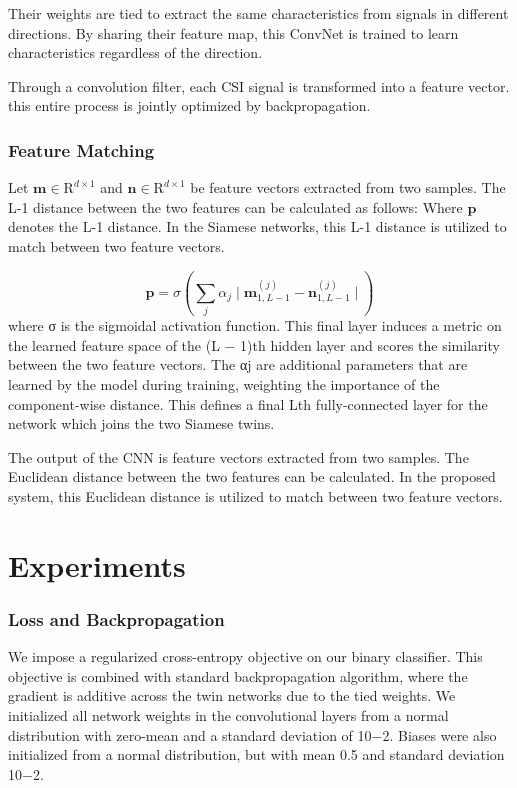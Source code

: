 \documentclass[runningheads]{llncs}
\begin{document}
Their weights are tied to extract the same characteristics from signals in different directions.
By sharing their feature map, this ConvNet is trained to learn characteristics regardless of the direction.

Through a convolution filter, each CSI signal is transformed into a feature vector. this entire process is jointly optimized by backpropagation.


\subsubsection{Feature Matching}

Let $\mathbf{m}\in{\mathrm{R}}^{d\times1}$ and $\mathbf{n}\in{\mathrm{R}}^{d\times1}$ be feature vectors extracted from two samples.
The L-1 distance between the two features can be calculated as  follows:
Where $\mathbf{p}$ denotes the L-1 distance. In the Siamese networks, this L-1 distance is utilized to match between two feature vectors.

\begin{equation}
    \mathbf{p} = 
    \sigma(\sum_j\alpha_{j}\mid
    \mathbf{m}_{1,L-1}^{(j)} - 
    \mathbf{n}_{1,L-1}^{(j)}\mid)  
\end{equation}
where σ is the sigmoidal
activation function. This final layer induces a metric on the learned feature space of the (L − 1)th hidden layer and scores the similarity between the two feature vectors. The αj are additional parameters that are learned by the model during training, weighting the importance of the component-wise distance. This defines a final Lth fully-connected layer for the network which joins the two Siamese twins.

The output of the CNN is feature vectors extracted from two samples. The Euclidean distance between the two features can be calculated.
In the proposed system, this Euclidean distance is utilized to match between two feature vectors.


\section{Experiments}

\subsubsection{Loss and Backpropagation}
 We impose a regularized cross-entropy objective on our binary classifier.
This objective is combined with standard backpropagation algorithm, where the gradient is additive across the twin networks due to the tied weights.
 We initialized all network weights in the convolutional layers from a normal distribution with zero-mean and a standard deviation of 10−2. Biases were also initialized from a normal distribution, but with mean 0.5 and standard deviation 10−2.
\end{document}
